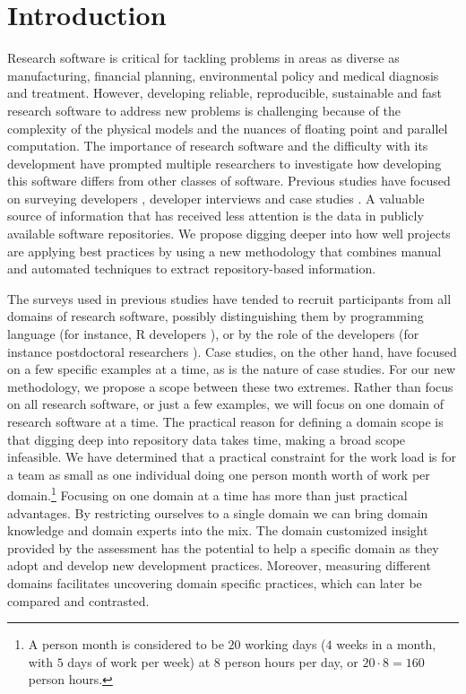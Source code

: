 \documentclass[runningheads]{llncs}
\begin{document}
\section{Introduction} \label{SecIntroduction}

Research software is critical for tackling problems in areas as diverse as
manufacturing, financial planning, environmental policy and medical diagnosis
and treatment.  However, developing reliable, reproducible, sustainable and fast
research software to address new problems is challenging because of the
complexity of the physical models and the nuances of floating point and parallel
computation. The importance of research software and the difficulty with its
development have prompted multiple researchers to investigate how developing
this software differs from other classes of software.  Previous studies have
focused on surveying developers
\cite{HannayEtAl2009,Nguyen-HoanEtAl2010,PintoEtAl2018}, developer interviews
\cite{Kelly2013} and case studies \cite{CarverEtAl2007,Segal2005}.  A
valuable source of information that has received less attention is the data in
publicly available software repositories.  We propose digging deeper into how
well projects are applying best practices by using a new methodology that
combines manual and automated techniques to extract repository-based
information.

The surveys used in previous studies have tended to recruit participants from
all domains of research software, possibly distinguishing them by programming
language (for instance, R developers \cite{PintoEtAl2018}), or by the role of
the developers (for instance postdoctoral researchers \cite{UditAndKatz2017}).
Case studies, on the other hand, have focused on a few specific examples at a
time, as is the nature of case studies.  For our new methodology, we propose a
scope between these two extremes.  Rather than focus on all research software,
or just a few examples, we will focus on one domain of research software at a
time. The practical reason for defining a domain scope is that digging deep into
repository data takes time, making a broad scope infeasible. We have determined
that a practical constraint for the work load is for a team as small as one
individual doing one person month worth of work per domain.\footnote{A person
month is considered to be $20$ working days ($4$ weeks in a month, with $5$ days
of work per week) at $8$ person hours per day, or $20 \cdot 8 = 160$ person
hours.} Focusing on one domain at a time has more than just practical
advantages.  By restricting ourselves to a single domain we can bring domain
knowledge and domain experts into the mix.  The domain customized insight
provided by the assessment has the potential to help a specific domain as they
adopt and develop new development practices.  Moreover, measuring different
domains facilitates uncovering domain specific practices, which can later be
compared and contrasted.
\end{document}

